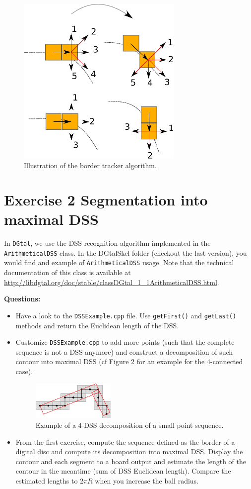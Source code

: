 \documentclass[a4paper, 11pt]{article}
\begin{document}
\begin{figure}[h]
\centering
\includegraphics[width=8cm]{orientations}
\caption{Illustration of the border tracker algorithm.}
\end{figure}


\section*{Exercise 2 \rm Segmentation into maximal DSS}

\par In \texttt{DGtal}, we use the DSS recognition algorithm implemented in the \texttt{ArithmeticalDSS} class. In the DGtalSkel folder (checkout the last version), you would find and example of \texttt{ArithmeticalDSS} usage. Note that the technical documentation of this class is available at \url{http://libdgtal.org/doc/stable/classDGtal_1_1ArithmeticalDSS.html}.

{\bf Questions:}
\begin{itemize}
	\item Have a look to the \texttt{DSSExample.cpp} file. Use \texttt{getFirst()} and \texttt{getLast()} methods and return the Euclidean length of the DSS.
	\item  Customize \texttt{DSSExample.cpp} to add more points (such that the complete sequence is not a DSS anymore) and construct a decomposition of such contour into maximal DSS (cf Figure 2 for an example for the 4-connected case).
	\begin{figure}[h]
	\centering
	\includegraphics[width=4cm]{exampleDSS-3.png}
	\caption{Example of a 4-DSS decomposition of a small point sequence.}
	\end{figure}
	
	\item From the first exercise, compute the sequence defined as the border of a digital disc and compute its decomposition into maximal DSS. Display the contour and each segment to a board output and estimate the length of the contour in the meantime (sum of DSS Euclidean length).  Compare the estimated lengths to $2\pi R$ when you increase the ball radius.
\end{itemize}
\end{document}
